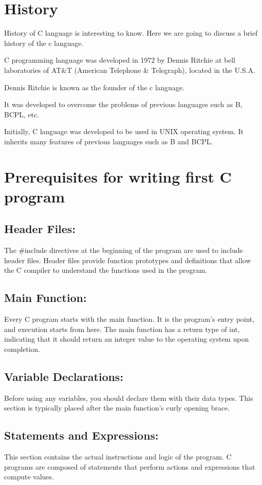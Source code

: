 \section{History}
History of C language is interesting to know. Here we are going to discuss a brief history of the c language.

C programming language was developed in 1972 by Dennis Ritchie at bell laboratories of AT\&T (American Telephone \& Telegraph), located in the U.S.A.

Dennis Ritchie is known as the founder of the c language.

It was developed to overcome the problems of previous languages such as B, BCPL, etc.

Initially, C language was developed to be used in UNIX operating system. It inherits many features of previous languages such as B and BCPL.
\section{Prerequisites for writing first C program}

\subsection{Header Files:}
The \#include directives at the beginning of the program are used to include header files. Header files provide function prototypes and definitions that allow the C compiler to understand the functions used in the program.

\subsection{Main Function:}
Every C program starts with the main function. It is the program's entry point, and execution starts from here. The main function has a return type of int, indicating that it should return an integer value to the operating system upon completion.

\subsection{Variable Declarations:}
Before using any variables, you should declare them with their data types. This section is typically placed after the main function's curly opening brace.

\subsection{Statements and Expressions:}
This section contains the actual instructions and logic of the program. C programs are composed of statements that perform actions and expressions that compute values.

